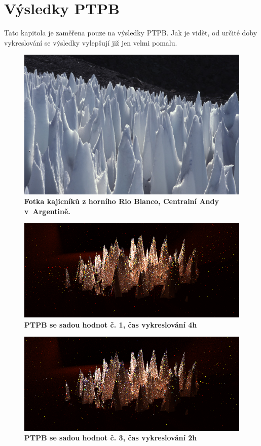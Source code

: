 \section{Výsledky PTPB}
Tato kapitola je zaměřena pouze na výsledky PTPB. Jak je vidět, od určité doby vykreslování se výsledky vylepšují již jen velmi pomalu. 
\begin{figure}[H]\centering
\includegraphics[width=0.7\linewidth]{obrazky-figures/kajinic5.jpg}\hfill
  \caption{\textbf{Fotka kajicníků z horního Rio Blanco, Centralní Andy v~Argentině\cite{wiki_pen}. }}
  \label{mereni-6-ptpb}
\end{figure}
\begin{figure}[H]\centering
\includegraphics[width=1\linewidth]{obrazky-figures/test-ptpb-1-4h.png}\hfill
  \caption{\textbf{PTPB se sadou hodnot č. 1, čas vykreslování 4h}}
  \label{mereni-6-ptpb}
\end{figure}
\begin{figure}[H]\centering
\includegraphics[width=1\linewidth]{obrazky-figures/test-ptpb-3-2h.png}\hfill
  \caption{\textbf{PTPB se sadou hodnot č. 3, čas vykreslování 2h}}
  \label{mereni-6-ptpb}
\end{figure}
